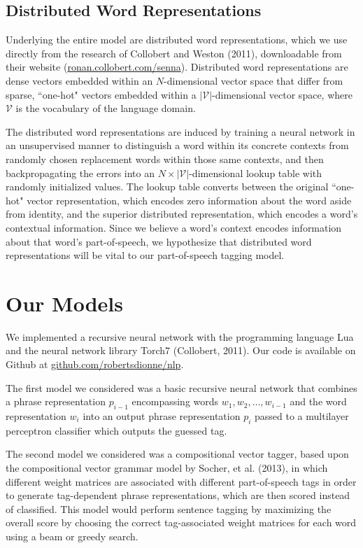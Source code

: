 \documentclass[11pt]{article}
\begin{document}
\subsection{Distributed Word Representations}

Underlying the entire model are distributed word representations, which we use directly from the research of Collobert and Weston (2011), downloadable from their website (\hyperlink{http://ronan.collobert.com/senna/}{ronan.collobert.com/senna}). Distributed word representations are dense vectors embedded within an $N$-dimensional vector space that differ from sparse, ``one-hot" vectors embedded within a $\left\vert\mathcal{V}\right\vert$-dimensional vector space, where $\mathcal{V}$ is the vocabulary of the language domain.

The distributed word representations are induced by training a neural network in an unsupervised manner to distinguish a word within its concrete contexts from randomly chosen replacement words within those same contexts, and then backpropagating the errors into an $N\times\left\vert\mathcal{V}\right\vert$-dimensional lookup table with randomly initialized values. The lookup table converts between the original ``one-hot" vector representation, which encodes zero information about the word aside from identity, and the superior distributed representation, which encodes a word's contextual information. Since we believe a word's context encodes information about that word's part-of-speech, we hypothesize that distributed word representations will be vital to our part-of-speech tagging model.

\section{Our Models}

We implemented a recursive neural network with the programming language Lua and the neural network library Torch7 (Collobert, 2011). Our code is available on Github at \hyperlink{http://github.com/robertsdionne/nlp}{github.com/robertsdionne/nlp}.

The first model we considered was a basic recursive neural network that combines a phrase representation $p_{i-1}$ encompassing words $w_1,w_2,\ldots,w_{i-1}$ and the word representation $w_i$ into an output phrase representation $p_i$ passed to a multilayer perceptron classifier which outputs the guessed tag.

The second model we considered was a compositional vector tagger, based upon the compositional vector grammar model by Socher, et al. (2013), in which different weight matrices are associated with different part-of-speech tags in order to generate tag-dependent phrase representations, which are then scored instead of classified. This model would perform sentence tagging by maximizing the overall score by choosing the correct tag-associated weight matrices for each word using a beam or greedy search.
\end{document}
